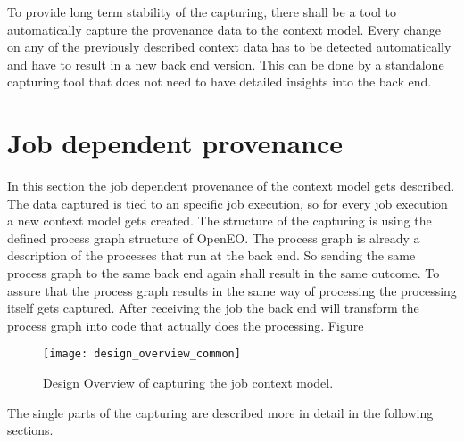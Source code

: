 \documentclass[draft,final]{vutinfth} %
\begin{document}
\begin{enumerate}
	To  provide long term stability of the capturing, there shall be a tool to automatically capture the provenance data to the context model. Every change on any of the previously described context data has to be detected automatically and have to result in a new back end version. This can be done by a standalone capturing tool that does not need to have detailed insights into the back end. 
	
\end{enumerate}
\section{Job dependent provenance}
In this section the job dependent provenance of the context model gets described. The data captured is tied to an specific job execution, so for every job execution a new context model gets created. The structure of the capturing is using the defined process graph structure of OpenEO. The process graph is already a description of the processes that run at the back end. So sending the same process graph to the same back end again shall result in the same outcome. To assure that the process graph results in the same way of processing the processing itself gets captured. After receiving the job the back end will transform the process graph into code that actually does the processing. Figure %

\begin{figure}[h]
	\centering
	\texttt{[image: design\_overview\_common]}
	\caption{Design Overview of capturing the job context model.}
	\label{fig:intro} %
\end{figure}

The single parts of the capturing are described more in detail in the following sections. 
\end{document}
